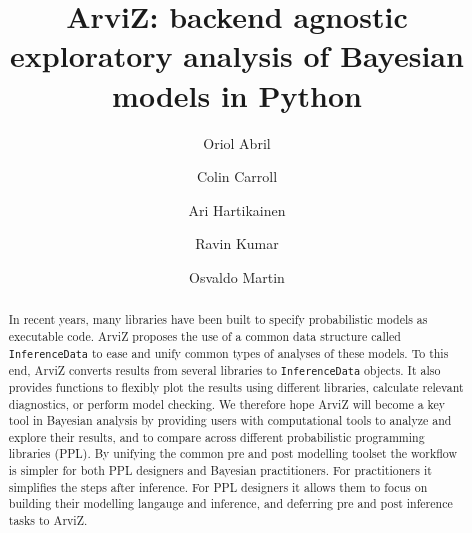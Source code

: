 \documentclass[anonymous=false, %
               format=acmsmall, %
               review=true, %
               screen=true, %
               nonacm=true]{acmart}
\begin{document}
\title{{ArviZ}: backend agnostic exploratory analysis of
{Bayesian} models in {Python}}

\author{Oriol Abril}
\affiliation{%
}

\author{Colin Carroll}

\author{Ari Hartikainen}

\author{Ravin Kumar}
\affiliation{%
}

\author{Osvaldo Martin}

\begin{abstract}
  In recent years, many libraries have been built to specify probabilistic models
  as executable code. ArviZ proposes the use of a common data structure called
  \texttt{InferenceData} to ease and unify common types of analyses of these models.
  To this end, ArviZ converts results from several libraries to
  \texttt{InferenceData} objects. It also provides functions to flexibly plot the
  results using different
  libraries, calculate relevant diagnostics, or perform model checking.
  We therefore hope ArviZ will become a key tool in Bayesian analysis by
  providing users with computational tools to analyze and explore their results, and to
  compare across different probabilistic programming libraries (PPL).
  By unifying the common pre and post modelling toolset the workflow is simpler
  for both PPL designers and Bayesian practitioners. For practitioners it
  simplifies the steps after inference. For PPL designers it allows them to
  focus on building their modelling langauge and inference, and deferring
  pre and post inference tasks to ArviZ.
\end{abstract}
\end{document}
